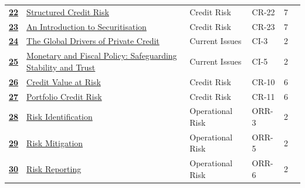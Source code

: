 \begin{longtable}{@{}r@{\hskip 7pt}L{6.35cm}@{\hskip 5pt}l@{\hskip 10pt}l@{\hskip 3pt}r@{\hskip 7pt}r@{}}
\hyperref[roi:22]{{\sffamily\bfseries\color{FRMGold}22}} & \hyperref[roi:22]{{\color{black}Structured Credit Risk}} & {\color{FRMGrey}Credit Risk} & {\color{FRMGrey}CR-22} & {\color{FRMGrey}7} & \hyperref[roi:22]{{\sffamily\bfseries\color{FRMNavy}\pageref{roi:22}}} \\
\hyperref[roi:23]{{\sffamily\bfseries\color{FRMGold}23}} & \hyperref[roi:23]{{\color{black}An Introduction to Securitisation}} & {\color{FRMGrey}Credit Risk} & {\color{FRMGrey}CR-23} & {\color{FRMGrey}7} & \hyperref[roi:23]{{\sffamily\bfseries\color{FRMNavy}\pageref{roi:23}}} \\
\hyperref[roi:24]{{\sffamily\bfseries\color{FRMGold}24}} & \hyperref[roi:24]{{\color{black}The Global Drivers of Private Credit}} & {\color{FRMGrey}Current Issues} & {\color{FRMGrey}CI-3} & {\color{FRMGrey}2} & \hyperref[roi:24]{{\sffamily\bfseries\color{FRMNavy}\pageref{roi:24}}} \\
\hyperref[roi:25]{{\sffamily\bfseries\color{FRMGold}25}} & \hyperref[roi:25]{{\color{black}Monetary and Fiscal Policy: Safeguarding Stability and Trust}} & {\color{FRMGrey}Current Issues} & {\color{FRMGrey}CI-5} & {\color{FRMGrey}2} & \hyperref[roi:25]{{\sffamily\bfseries\color{FRMNavy}\pageref{roi:25}}} \\
\hyperref[roi:26]{{\sffamily\bfseries\color{FRMGold}26}} & \hyperref[roi:26]{{\color{black}Credit Value at Risk}} & {\color{FRMGrey}Credit Risk} & {\color{FRMGrey}CR-10} & {\color{FRMGrey}6} & \hyperref[roi:26]{{\sffamily\bfseries\color{FRMNavy}\pageref{roi:26}}} \\
\hyperref[roi:27]{{\sffamily\bfseries\color{FRMGold}27}} & \hyperref[roi:27]{{\color{black}Portfolio Credit Risk}} & {\color{FRMGrey}Credit Risk} & {\color{FRMGrey}CR-11} & {\color{FRMGrey}6} & \hyperref[roi:27]{{\sffamily\bfseries\color{FRMNavy}\pageref{roi:27}}} \\
\hyperref[roi:28]{{\sffamily\bfseries\color{FRMGold}28}} & \hyperref[roi:28]{{\color{black}Risk Identification}} & {\color{FRMGrey}Operational Risk} & {\color{FRMGrey}ORR-3} & {\color{FRMGrey}2} & \hyperref[roi:28]{{\sffamily\bfseries\color{FRMNavy}\pageref{roi:28}}} \\
\hyperref[roi:29]{{\sffamily\bfseries\color{FRMGold}29}} & \hyperref[roi:29]{{\color{black}Risk Mitigation}} & {\color{FRMGrey}Operational Risk} & {\color{FRMGrey}ORR-5} & {\color{FRMGrey}2} & \hyperref[roi:29]{{\sffamily\bfseries\color{FRMNavy}\pageref{roi:29}}} \\
\hyperref[roi:30]{{\sffamily\bfseries\color{FRMGold}30}} & \hyperref[roi:30]{{\color{black}Risk Reporting}} & {\color{FRMGrey}Operational Risk} & {\color{FRMGrey}ORR-6} & {\color{FRMGrey}2} & \hyperref[roi:30]{{\sffamily\bfseries\color{FRMNavy}\pageref{roi:30}}} \\

\end{longtable}
